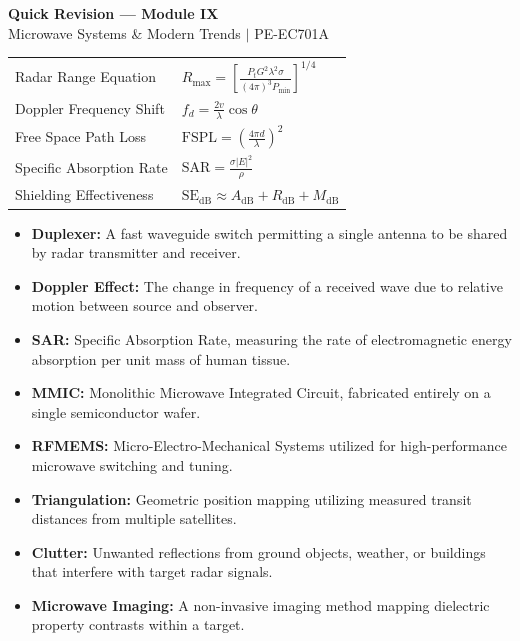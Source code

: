 \documentclass[12pt,a4paper]{article}
\renewcommand{\arraystretch}{1.45}
\begin{document}
\newpage
\begin{center}
  {\large\bfseries\color{myred} Quick Revision --- Module IX}\\[3pt]
  {\small\color{mydark} Microwave Systems \& Modern Trends $|$ PE-EC701A}
\end{center}
\noindent{\color{myred}\rule{\linewidth}{1.2pt}}
\vspace{4pt}

\begin{tcolorbox}[formulabox, title={\textbf{Key Formulas at a Glance}}]
\renewcommand{\arraystretch}{1.3}
\begin{tabularx}{\linewidth}{B{4.5cm} X}Radar Range Equation   & $R_{\text{max}} = \left[ \frac{P_t G^2 \lambda^2 \sigma}{(4\pi)^3 P_{\text{min}}} \right]^{1/4}$ \\[4pt]
Doppler Frequency Shift & $f_d = \frac{2 v}{\lambda} \cos \theta$ \\[4pt]
Free Space Path Loss    & $\text{FSPL} = \left(\frac{4\pi d}{\lambda}\right)^{\!2}$ \\[4pt]
Specific Absorption Rate& $\text{SAR} = \frac{\sigma |E|^2}{\rho}$ \\[4pt]
Shielding Effectiveness & $\text{SE}_{\text{dB}} \approx A_{\text{dB}} + R_{\text{dB}} + M_{\text{dB}}$
\end{tabularx}
\end{tcolorbox}

\begin{tcolorbox}[defbox, title={\textbf{One-Line Definitions}}]
\begin{itemize}[leftmargin=*, itemsep=2.5pt, topsep=0pt]
  \item \textbf{Duplexer:} A fast waveguide switch permitting a single antenna to be shared by radar transmitter and receiver.
  \item \textbf{Doppler Effect:} The change in frequency of a received wave due to relative motion between source and observer.
  \item \textbf{SAR:} Specific Absorption Rate, measuring the rate of electromagnetic energy absorption per unit mass of human tissue.
  \item \textbf{MMIC:} Monolithic Microwave Integrated Circuit, fabricated entirely on a single semiconductor wafer.
  \item \textbf{RFMEMS:} Micro-Electro-Mechanical Systems utilized for high-performance microwave switching and tuning.
  \item \textbf{Triangulation:} Geometric position mapping utilizing measured transit distances from multiple satellites.
  \item \textbf{Clutter:} Unwanted reflections from ground objects, weather, or buildings that interfere with target radar signals.
  \item \textbf{Microwave Imaging:} A non-invasive imaging method mapping dielectric property contrasts within a target.
\end{itemize}
\end{tcolorbox}
\end{document}
